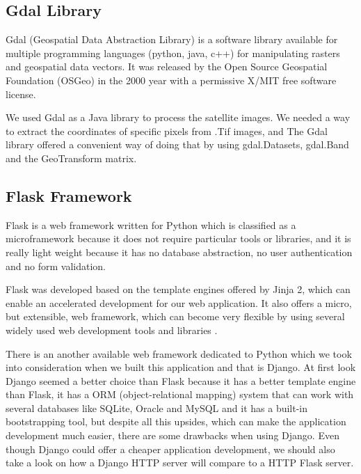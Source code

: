 \documentclass[12pt, a4paper]{report}
\begin{document}
\subsection{Gdal Library}

\quad
Gdal (Geospatial Data Abstraction Library) is a software library available for multiple programming languages (python, java, c++) for manipulating rasters and geospatial data vectors. It was released by the Open Source Geospatial Foundation (OSGeo) in the 2000 year with a permissive X/MIT free software license\cite{Gdal}. 
\par 

We used Gdal as a Java library to process the satellite images. We needed a way to extract the coordinates of specific pixels from .Tif images, and The Gdal library offered a convenient way of doing that by using gdal.Datasets, gdal.Band and the GeoTransform matrix.

\subsection{Flask Framework}

\quad
Flask is a web framework written for Python which is classified as a microframework because it does not require particular tools or libraries, and it is really light weight because it has no database abstraction, no user authentication and no form validation.
\par 

Flask was developed based on the template engines offered by Jinja 2, which can enable an accelerated development for our web application. It also offers a micro, but extensible, web framework, which can become very flexible by using several widely used web development tools and libraries \cite{Flask1}.
\par 

There is an another available web framework dedicated to Python which we took into consideration when we built this application and that is Django. At first look Django seemed a better choice than Flask because it has a better template engine than Flask, it has a ORM (object-relational mapping) system that can work with several databases like SQLite, Oracle and MySQL and it has a built-in bootstrapping tool, but despite all this upsides, which can make the application development much easier, there are some drawbacks when using Django. Even though Django could offer a cheaper application development, we should also take a look on how a Django HTTP server will compare to a HTTP Flask server.
\par 
\end{document}
